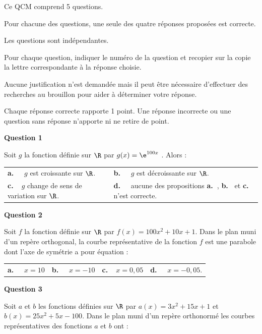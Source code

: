 \medskip

Ce QCM comprend 5 questions.

 Pour chacune des questions, une seule des quatre réponses proposées est correcte. 

Les questions sont indépendantes.

Pour chaque question, indiquer le numéro de la question et recopier sur la copie la lettre
correspondante à la réponse choisie.

 Aucune justification n'est demandée mais il peut être
nécessaire d'effectuer des recherches au brouillon pour aider à déterminer votre réponse.

Chaque réponse correcte rapporte 1 point. Une réponse incorrecte ou une question sans
réponse n'apporte ni ne retire de point.

\medskip

\textbf{Question 1 }

\medskip 

Soit $g$ la fonction définie sur $\R$ par $g(x) = \e^{100x}$ . Alors :

\medskip 

\begin{tabularx}{\linewidth}{*{2}{X}}
\textbf{a.~~} $g$ est croissante sur $\R$. &\textbf{b.~~} $g $ est décroissante sur $\R$. \\\textbf{c.~~}$g$ change de sens de variation sur $\R$. & \textbf{d.~~} aucune des propositions \textbf{a.~}, \textbf{b.~} et \textbf{c.~} n'est correcte.
\end{tabularx}

\medskip

\textbf{Question 2}

\medskip 


Soit $f$ la fonction définie sur $\R$ par $f(x) = 100x^2 + 10x + 1$. Dans le plan muni d'un repère
orthogonal, la courbe représentative de la fonction $f$ est une parabole dont l'axe de
symétrie a pour équation :

\medskip 

\begin{tabularx}{\linewidth}{*{4}{X}}
\textbf{a.~~} $x = 10 $ &\textbf{b.~~} $x = -10 $&\textbf{c.~~}$x = 0,05 $& \textbf{d.~~} $ x = -0,05 $.
\end{tabularx}

\medskip

\textbf{Question 3}

\medskip 

Soit $a$ et $b$ les fonctions définies sur $\R$ par $a(x) = 3x^2 + 15x+ 1$ et
$b(x) = 25x^2 + 5x - 100$. Dans le plan muni d'un repère orthonormé les courbes
représentatives des fonctions $a$ et $b$ ont :

